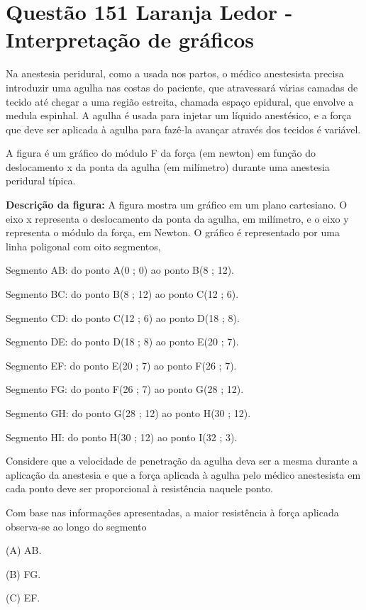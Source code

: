 \section{Questão 151 Laranja Ledor - Interpretação de gráficos}

Na anestesia peridural, como a usada nos partos, o médico anestesista precisa introduzir uma agulha nas costas do paciente, que atravessará várias camadas de tecido até chegar a uma região estreita, chamada espaço epidural, que envolve a medula espinhal. A agulha é usada para injetar um líquido anestésico, e a força que deve ser aplicada à agulha para fazê-la  avançar através dos tecidos é variável.

A figura é um gráfico do módulo F da força (em newton) em função do deslocamento x da ponta da agulha (em milímetro) durante uma anestesia peridural típica. 

\noindent \textbf{Descrição da figura:} A figura mostra um gráfico em um plano cartesiano. O eixo x representa o deslocamento da ponta da agulha, em milímetro, e o eixo y representa o módulo da força, em Newton. O gráfico é representado por uma linha poligonal com oito segmentos, 

\noindent Segmento AB: do ponto A(0 ; 0) ao ponto B(8 ; 12).

\noindent Segmento BC: do ponto B(8 ; 12) ao ponto C(12 ; 6).

\noindent Segmento CD: do ponto C(12 ; 6) ao ponto D(18 ; 8).

\noindent Segmento DE: do ponto D(18 ; 8) ao ponto E(20 ; 7).

\noindent Segmento EF: do ponto E(20 ; 7) ao ponto F(26 ; 7).

\noindent Segmento FG: do ponto F(26 ; 7) ao ponto G(28 ; 12).

\noindent Segmento GH: do ponto G(28 ; 12) ao ponto H(30 ; 12).

\noindent Segmento HI: do ponto H(30 ; 12) ao ponto I(32 ; 3).


Considere que a velocidade de penetração da agulha deva ser a mesma durante a aplicação da anestesia e que a força aplicada à agulha pelo médico anestesista em cada ponto deve ser proporcional à resistência naquele ponto.

Com base nas informações apresentadas, a maior resistência à força aplicada observa-se ao longo do segmento

\noindent (A) AB.

\noindent (B) FG.

\noindent (C) EF.

